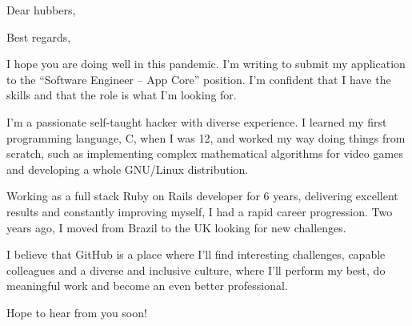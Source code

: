 \documentclass{pudivacv}
\begin{document}
\date{April 26, 2021}
\opening{Dear hubbers,}
\closing{Best regards,}
\makelettertitle

I hope you are doing well in this pandemic. I’m writing to submit my application to the “Software Engineer – App Core” position. I’m confident that I have the skills and that the role is what I’m looking for.

I'm a passionate self-taught hacker with diverse experience. I learned my first programming language, C, when I was 12, and worked my way doing things from scratch, such as implementing complex mathematical algorithms for video games and developing a whole GNU/Linux distribution.

Working as a full stack Ruby on Rails developer for 6 years, delivering excellent results and constantly improving myself, I had a rapid career progression. Two years ago, I moved from Brazil to the UK looking for new challenges.

I believe that GitHub is a place where I’ll find interesting challenges, capable colleagues and a diverse and inclusive culture, where I’ll perform my best, do meaningful work and become an even better professional.

Hope to hear from you soon!

\makeletterclosing
\end{document}
